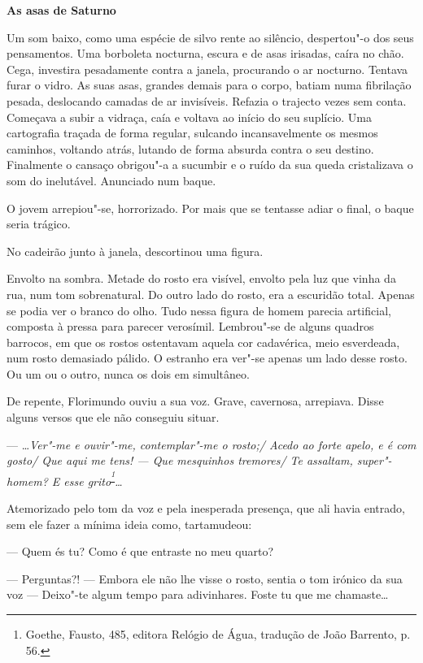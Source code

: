 \vspace*{1.8cm}
\noindent{}\textbf{As asas de Saturno}

\bigskip

Um som baixo, como uma espécie de silvo rente ao silêncio, despertou"-o
dos seus pensamentos. Uma borboleta nocturna, escura e de asas irisadas,
caíra no chão. Cega, investira pesadamente contra a janela, procurando o
ar nocturno. Tentava furar o vidro. As suas asas, grandes demais para o
corpo, batiam numa fibrilação pesada, deslocando camadas de ar
invisíveis. Refazia o trajecto vezes sem conta. Começava a subir a
vidraça, caía e voltava ao início do seu suplício. Uma cartografia
traçada de forma regular, sulcando incansavelmente os mesmos caminhos,
voltando atrás, lutando de forma absurda contra o seu destino.
Finalmente o cansaço obrigou"-a a sucumbir e o ruído da sua queda
cristalizava o som do inelutável. Anunciado num baque.

O jovem arrepiou"-se, horrorizado. Por mais que se tentasse adiar o
final, o baque seria trágico.

No cadeirão junto à janela, descortinou uma figura.

Envolto na sombra. Metade do rosto era visível, envolto pela luz que
vinha da rua, num tom sobrenatural. Do outro lado do rosto, era a
escuridão total. Apenas se podia ver o branco do olho. Tudo nessa figura
de homem parecia artificial, composta à pressa para parecer verosímil.
Lembrou"-se de alguns quadros barrocos, em que os rostos ostentavam
aquela cor cadavérica, meio esverdeada, num rosto demasiado pálido. O
estranho era ver"-se apenas um lado desse rosto. Ou um ou o outro, nunca
os dois em simultâneo.

De repente, Florimundo ouviu a sua voz. Grave, cavernosa, arrepiava.
Disse alguns versos que ele não conseguiu situar.

--- \ldots{}\emph{Ver"-me e ouvir"-me, contemplar"-me o rosto;/ Acedo ao forte
apelo, e é com gosto/ Que aqui me tens! --- Que mesquinhos tremores/ Te
assaltam, super"-homem? E esse grito}\textsuperscript{\emph{\footnote{Goethe,
  Fausto, 485, editora Relógio de Água, tradução de João Barrento, p.
  56. }}}\emph{\ldots{}}

Atemorizado pelo tom da voz e pela inesperada presença, que ali havia
entrado, sem ele fazer a mínima ideia como, tartamudeou:

--- Quem és tu? Como é que entraste no meu quarto?

--- Perguntas?! --- Embora ele não lhe visse o rosto, sentia o tom irónico
da sua voz --- Deixo"-te algum tempo para adivinhares. Foste tu que me
chamaste\ldots{}

